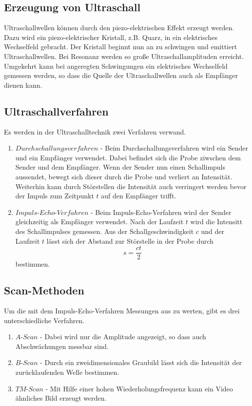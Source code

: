 \subsection{Erzeugung von Ultraschall}
\label{sec:Ultraschall}
Ultraschallwellen können durch den piezo-elektrischen Effekt erzeugt werden. Dazu wird ein piezo-elektrischer
Kristall, z.B. Quarz, in ein elektrisches Wechselfeld gebracht. Der Kristall beginnt nun an zu schwingen und
emittiert Ultraschallwellen. Bei Resonanz werden so große Ultraschallamplituden erreicht.
Umgekehrt kann bei angeregten Schwingungen ein elektrisches Wechselfeld gemessen werden, so dass die Quelle
der Ultraschallwellen auch als Empfänger dienen kann.

\subsection{Ultraschallverfahren}
\label{sec:Ultraschallverfahren}
Es werden in der Ultraschalltechnik zwei Verfahren verwand.
\begin{enumerate}
    \item $Durchschallungsverfahren$ - Beim Durchschallungsverfahren wird ein Sender und ein Empfänger verwendet. Dabei befindet sich die
    Probe ziwschen dem Sender und dem Empfänger. Wenn der Sender nun einen Schallimpuls aussendet, bewegt sich
    dieser durch die Probe und verliert an Intensität. Weiterhin kann durch Störstellen die Intensität auch
    verringert werden bevor der Impuls zum Zeitpunkt $t$ auf den Empfänger trifft.
    \item $Impuls$-$Echo$-$Verfahren$ - Beim Impuls-Echo-Verfahren wird der Sender gleichzeitig als Empfänger verwendet. Nach der Laufzeit
    $t$ wird die Intensitt des Schallimpulses gemessen. Aus der Schallgeschwindigkeit $c$ und der Laufzeit $t$
    lässt sich der Abstand zur Störstelle in der Probe durch
    \begin{equation}
        \label{eqn:Strecke}
        s = \frac{ct}{2}
    \end{equation}
    bestimmen.
\end{enumerate}

\subsection{Scan-Methoden}
\label{sec:Scan}
Um die mit dem Impuls-Echo-Verfahren Messungen aus zu werten, gibt es drei unterschiedliche Verfahren.
\begin{enumerate}
    \item $A$-$Scan$ - Dabei wird nur die Amplitude angezeigt, so dass auch Abschwächungen messbar sind.
    \item $B$-$Scan$ - Durch ein zweidimensionales Graubild lässt sich die Intensität der zurücklaufenden
    Welle bestimmen.
    \item $TM$-$Scan$ - Mit Hilfe einer hohen Wiederholungsfrequenz kann ein Video ähnliches Bild erzeugt
    werden.
\end{enumerate}